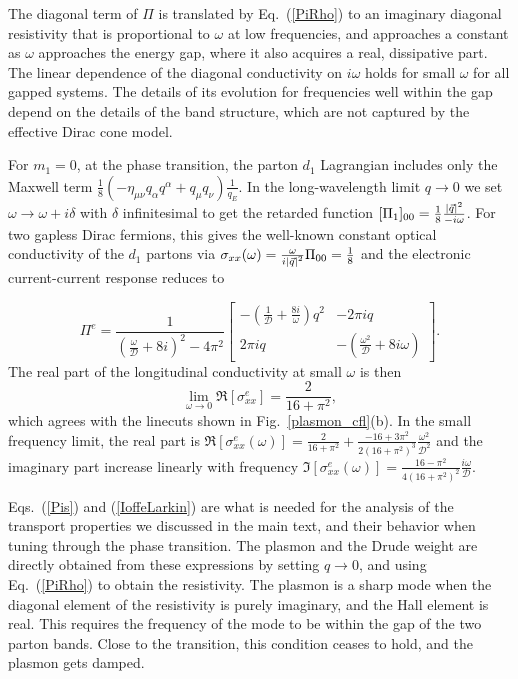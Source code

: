 \documentclass[aps,prl,twocolumn,superscriptaddress,floatfix, 10pt,longbibliography, nofootinbib]{revtex4-2}
\begin{document}
The diagonal term of $\Pi$ is translated by Eq.~(\ref{PiRho}) to an imaginary diagonal resistivity that is proportional to $\omega$ at low frequencies, and approaches a constant as $\omega$ approaches the energy gap, where it also acquires a real, dissipative part. The linear dependence of the diagonal conductivity on $i\omega$ holds for small $\omega$ for all gapped systems. The details of its evolution for frequencies well within the gap depend on the details of the band structure, which are not captured by the effective Dirac cone model.

For $m_1=0$, at the phase transition, the parton $d_1$ Lagrangian includes only the Maxwell term $\frac{1}{8}\left(-\eta_{\mu\nu}q_\alpha q^\alpha+q_\mu q_\nu\right)\frac{1}{q_E}$.
In the long-wavelength limit $q\rightarrow 0$ we set $\omega\rightarrow \omega+i\delta$ with $\delta$ infinitesimal to get the retarded function $[\Pi_1]_{00}=\frac{1}{8}\frac{\abs{\vec{q}}^2}{-i \omega}$. For two gapless Dirac fermions, this gives the well-known constant optical conductivity of the $d_1$ partons via $\sigma_{xx}(\omega)=\frac{\omega}{i\abs{\vec{q}}^2}\Pi_{00}=\frac{1}{8}$ and the electronic current-current response reduces to






\begin{equation}
\Pi^e=\frac{1}{(\frac{\omega}{\mathcal{D}}+8i)^2-4\pi^2}\begin{bmatrix}
    -(\frac{1}{\mathcal{D}}+\frac{8i}{\omega})q^2 & -2\pi iq\\
    2\pi iq & -(\frac{\omega^2}{\mathcal{D}}+8i\omega)
    \end{bmatrix}. \label{Pi_at_m=0}
\end{equation}
The real part of the longitudinal conductivity  at small $\omega$ is then
\begin{equation}
   \lim_{\omega\rightarrow 0}\Re[\sigma^e_{xx}]=\frac{2}{16+\pi^2}, \label{sigma_at_m=0}
\end{equation}
which agrees with the linecuts shown in Fig.~\ref{plasmon_cfl}(b).  In the small frequency limit, the real part is $\Re[\sigma^e_{xx}(\omega)]=\frac{2}{16+\pi^2}+\frac{-16+3\pi^2}{2(16+\pi^2)^3}\frac{\omega^2}{\mathcal{D}^2}$ and the imaginary part increase linearly with frequency $\Im[\sigma^e_{xx}(\omega)]=\frac{16-\pi^2}{4(16+\pi^2)^2}\frac{i\omega}{\mathcal{D}}$.



Eqs.~(\ref{Pis}) and (\ref{IoffeLarkin}) are what is needed for the analysis of the transport properties we discussed in the main text, and their behavior when tuning through the phase transition.
The plasmon and the Drude weight are directly obtained from these expressions by setting  $q\rightarrow0$, and using Eq.~(\ref{PiRho}) to obtain the resistivity. The plasmon is a sharp mode when the diagonal element of the resistivity is purely imaginary, and the Hall element is real. This requires the frequency of the mode to be within the gap of the two parton bands. Close to the transition, this condition ceases to hold, and the plasmon gets damped.
\end{document}
